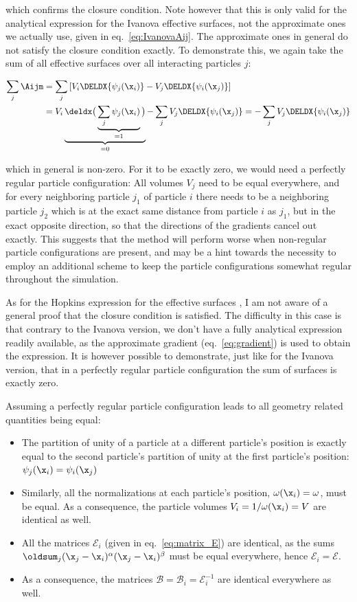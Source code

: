 which confirms the closure condition. Note however that this is only valid for the analytical
expression for the Ivanova effective surfaces, not the approximate ones we actually use, given in
eq.~\ref{eq:IvanovaAij}. The approximate ones in general do not satisfy the closure condition
exactly. To demonstrate this, we again take the sum of all effective surfaces over all interacting
particles $j$:

\begin{align}
    \sum_j \Aijm &= \sum_j \left[ V_i \DELDX{\psi_j(\x_i)} - V_j \DELDX{\psi_i(\x_j)} \right] \\
    &=  V_i  \underbrace{
        \deldx \big( \underbrace{\sum_j \psi_j(\x_i)}_{=1} \big)
        }_{= 0} - \sum_j V_j \DELDX{\psi_i(\x_j)}
    = - \sum_j V_j \DELDX{\psi_i(\x_j)}
\end{align}

which in general is non-zero. For it to be exactly zero, we would need a perfectly regular particle
configuration: All volumes $V_j$ need to be equal everywhere, and for every neighboring particle
$j_1$ of particle $i$ there needs to be a neighboring particle $j_2$ which is at the exact same
distance from particle $i$ as $j_1$, but in the exact opposite direction, so that the directions of
the gradients cancel out exactly. This suggests that the method will perform worse when non-regular
particle configurations are present, and may be a hint towards the necessity to employ an
additional scheme to keep the particle configurations somewhat regular throughout the simulation.

As for the Hopkins expression for the effective surfaces \Aij, I am not aware of a general proof
that the closure condition is satisfied. The difficulty in this case is that contrary to the
Ivanova version, we don't have a fully analytical expression readily available, as the approximate
gradient (eq.~\ref{eq:gradient}) is used to obtain the expression. It is however possible to
demonstrate, just like for the Ivanova version, that in a perfectly regular particle configuration
the sum of surfaces is exactly zero.

Assuming a perfectly regular particle configuration leads to all geometry related quantities being
equal:
\begin{itemize}
\item The partition of unity of a particle at a different particle's position is exactly equal to
the second particle's partition of unity at the first particle's position: $\psi_j(\x_i) =
\psi_i(\x_j)$
\item Similarly, all the normalizations at each particle's position, $\omega(\x_i) = \omega$, must
be equal. As a consequence, the particle volumes $V_i = 1 / \omega(\x_i) = V$ are identical as well.
\item All the matrices $\mathcal{E}_i$ (given in eq.~\ref{eq:matrix_E}) are identical, as the sums
$\oldsum_j (\x_j - \x_i)^\alpha(\x_j - \x_i)^\beta$ must be equal everywhere, hence $\mathcal{E}_i
= \mathcal{E}$.
\item As a consequence, the matrices $\mathcal{B} = \mathcal{B}_i = \mathcal{E}_i^{-1}$ are
identical everywhere as well.
\end{itemize}

